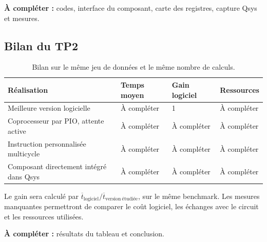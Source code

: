 \documentclass[a4paper,11pt]{article}
\begin{document}
\textbf{À compléter :} codes, interface du composant, carte des registres, capture Qsys et mesures.

\subsection*{Bilan du TP2}
\begin{table}[H]
\centering
\small
\begin{tabularx}{\linewidth}{@{}Xlll@{}}
\toprule
Réalisation & Temps moyen & Gain logiciel & Ressources\\
\midrule
Meilleure version logicielle & À compléter & 1 & À compléter\\
Coprocesseur par PIO, attente active & À compléter & À compléter & À compléter\\
Instruction personnalisée multicycle & À compléter & À compléter & À compléter\\
Composant directement intégré dans Qsys & À compléter & À compléter & À compléter\\
\bottomrule
\end{tabularx}
\caption{Bilan sur le même jeu de données et le même nombre de calculs.}
\end{table}

Le gain sera calculé par $\overline{t}_{\mathrm{logiciel}}/\overline{t}_{\mathrm{version\ étudiée}}$, sur le même benchmark. Les mesures manquantes permettront de comparer le coût logiciel, les échanges avec le circuit et les ressources utilisées.

\textbf{À compléter :} résultats du tableau et conclusion.
\end{document}
